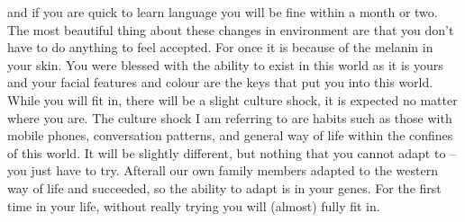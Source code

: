 and if you are quick to learn language you will be fine within a month or two. The most beautiful thing about these changes in environment are that you don’t have to do anything to feel accepted. For once it is because of the melanin in your skin. You were blessed with the ability to exist in this world as it is yours and your facial features and colour are the keys that put you into this world. While you will fit in, there will be a slight culture shock, it is expected no matter where you are. The culture shock I am referring to are habits such as those with mobile phones, conversation patterns, and general way of life within the confines of this world. It will be slightly different, but nothing that you cannot adapt to – you just have to try. Afterall our own family members adapted to the western way of life and succeeded, so the ability to adapt is in your genes. For the first time in your life, without really trying you will (almost) fully fit in. 
